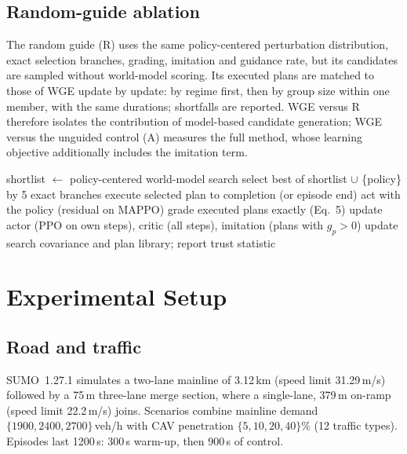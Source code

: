 \documentclass[conference]{IEEEtran}
\begin{document}
\subsection{Random-guide ablation}
The random guide (R) uses the same policy-centered perturbation distribution, exact selection branches, grading, imitation and guidance rate, but its candidates are sampled without world-model scoring. Its executed plans are matched to those of WGE update by update: by regime first, then by group size within one member, with the same durations; shortfalls are reported. %
WGE versus R therefore isolates the contribution of model-based candidate generation; WGE versus the unguided control (A) measures the full method, whose learning objective additionally includes the imitation term.

\begin{algorithm}[t]
\caption{WGE training (one update)}
\label{alg:wge}
\small
\begin{algorithmic}[1]
      \State shortlist $\gets$ policy-centered world-model search
      \State select best of shortlist $\cup$ \{policy\} by 5 exact branches
      \State execute selected plan to completion (or episode end)
    \Else \State act with the policy (residual on MAPPO)
    \EndIf
  \EndFor
\EndFor
\State grade executed plans exactly (Eq.~5)
\State update actor (PPO on own steps), critic (all steps), imitation (plans with $g_p>0$)
\State update search covariance and plan library; report trust statistic
\end{algorithmic}
\end{algorithm}

\section{Experimental Setup}

\subsection{Road and traffic}
SUMO~1.27.1 simulates a two-lane mainline of 3.12\,km (speed limit 31.29\,m/s) followed by a 75\,m three-lane merge section, where a single-lane, 379\,m on-ramp (speed limit 22.2\,m/s) joins. %
Scenarios combine mainline demand $\{1900,2400,2700\}$\,veh/h with CAV penetration $\{5,10,20,40\}\%$ (12 traffic types). Episodes last 1200\,s: 300\,s warm-up, then 900\,s of control.
\end{document}
